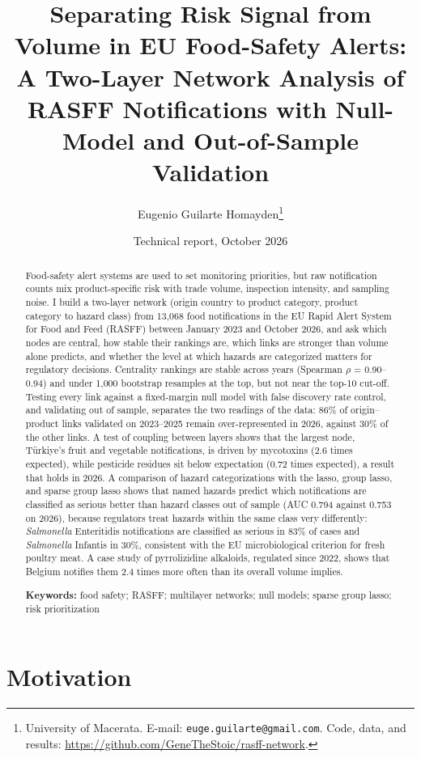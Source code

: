 \documentclass[11pt]{article}
\title{Separating Risk Signal from Volume in EU Food-Safety Alerts: A Two-Layer Network Analysis of RASFF Notifications with Null-Model and Out-of-Sample Validation}
\author{Eugenio Guilarte Homayden\thanks{University of Macerata. E-mail: \texttt{euge.guilarte@gmail.com}. Code, data, and results: \url{https://github.com/GeneTheStoic/rasff-network}.}}
\date{Technical report, October 2026}
\begin{document}
\maketitle
\begin{abstract}
\noindent Food-safety alert systems are used to set monitoring priorities, but raw notification counts mix product-specific risk with trade volume, inspection intensity, and sampling noise. I build a two-layer network (origin country to product category, product category to hazard class) from 13,068 food notifications in the EU Rapid Alert System for Food and Feed (RASFF) between January 2023 and October 2026, and ask which nodes are central, how stable their rankings are, which links are stronger than volume alone predicts, and whether the level at which hazards are categorized matters for regulatory decisions. Centrality rankings are stable across years (Spearman $\rho$ = 0.90–0.94) and under 1,000 bootstrap resamples at the top, but not near the top-10 cut-off. Testing every link against a fixed-margin null model with false discovery rate control, and validating out of sample, separates the two readings of the data: 86\% of origin–product links validated on 2023–2025 remain over-represented in 2026, against 30\% of the other links. A test of coupling between layers shows that the largest node, Türkiye's fruit and vegetable notifications, is driven by mycotoxins (2.6 times expected), while pesticide residues sit below expectation (0.72 times expected), a result that holds in 2026. A comparison of hazard categorizations with the lasso, group lasso, and sparse group lasso shows that named hazards predict which notifications are classified as serious better than hazard classes out of sample (AUC 0.794 against 0.753 on 2026), because regulators treat hazards within the same class very differently: \emph{Salmonella} Enteritidis notifications are classified as serious in 83\% of cases and \emph{Salmonella} Infantis in 30\%, consistent with the EU microbiological criterion for fresh poultry meat. A case study of pyrrolizidine alkaloids, regulated since 2022, shows that Belgium notifies them 2.4 times more often than its overall volume implies.

\medskip
\noindent\raggedright\textbf{Keywords:} food safety; RASFF; multilayer networks; null models; sparse group lasso; risk prioritization\par
\end{abstract}
\section{Motivation}
\end{document}
